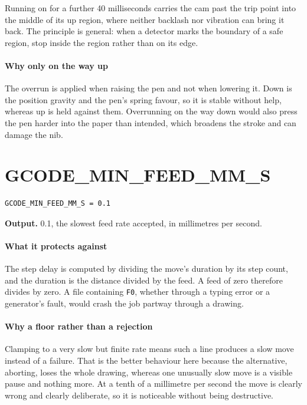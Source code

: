 Running on for a further 40 milliseconds carries the cam past the trip point into the middle of its up region, where neither backlash nor vibration can bring it back. The principle is general: when a detector marks the boundary of a safe region, stop inside the region rather than on its edge.


\paragraph{Why only on the way up}
The overrun is applied when raising the pen and not when lowering it. Down is the position gravity and the pen's spring favour, so it is stable without help, whereas up is held against them. Overrunning on the way down would also press the pen harder into the paper than intended, which broadens the stroke and can damage the nib.


\section{GCODE\_MIN\_FEED\_MM\_S}
\begin{lstlisting}[style=sig]
GCODE_MIN_FEED_MM_S = 0.1
\end{lstlisting}

\noindent\textbf{Output.} 0.1, the slowest feed rate accepted, in millimetres per second.


\paragraph{What it protects against}
The step delay is computed by dividing the move's duration by its step count, and the duration is the distance divided by the feed. A feed of zero therefore divides by zero. A file containing \texttt{F0}, whether through a typing error or a generator's fault, would crash the job partway through a drawing.


\paragraph{Why a floor rather than a rejection}
Clamping to a very slow but finite rate means such a line produces a slow move instead of a failure. That is the better behaviour here because the alternative, aborting, loses the whole drawing, whereas one unusually slow move is a visible pause and nothing more. At a tenth of a millimetre per second the move is clearly wrong and clearly deliberate, so it is noticeable without being destructive.



